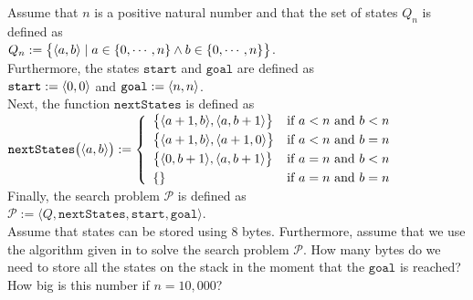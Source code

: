 \exercise
Assume that $n$ is a positive natural number and that the set of states $Q_n$ is defined as
\\[0.2cm]
\hspace*{1.3cm}
$Q_n := \bigl\{ \pair(a, b) \mid a \in \{0,\cdots,n\} \wedge b \in \{0,\cdots,n\} \bigr\}$.
\\[0.2cm]
Furthermore, the states $\mathtt{start}$ and $\mathtt{goal}$ are defined as
\\[0.2cm]
\hspace*{1.3cm}
$\mathtt{start} := \pair(0,0)$ \quad and \quad $\mathtt{goal} := \pair(n,n)$.
\\[0.2cm]
Next, the function $\mathtt{nextStates}$ is defined as
\\[0.2cm]
\hspace*{1.3cm}
$\mathtt{nextStates}\bigl(\pair(a,b)\bigr) := \left\{
\begin{array}{ll}
\bigl\{\pair(a+1,b), \pair(a,b+1)\bigr\}  & \mbox{if $a < n$ and $b < n$} \\[0.1cm]
\bigl\{\pair(a+1,b), \pair(a+1,0)\bigr\}  & \mbox{if $a < n$ and $b = n$} \\[0.1cm]
\bigl\{\pair(0,b+1), \pair(a,b+1)\bigr\}  & \mbox{if $a = n$ and $b < n$} \\[0.1cm]
\{\}  & \mbox{if $a = n$ and $b = n$} 
\end{array}
\right.
$
\\[0.2cm]
Finally, the search problem $\mathcal{P}$ is defined as
\\[0.2cm]
\hspace*{1.3cm}
$\mathcal{P} := \langle Q, \mathtt{nextStates}, \mathtt{start}, \mathtt{goal} \rangle$.
\\[0.2cm]
Assume that states can be stored using 8 bytes.  Furthermore, assume that we use the algorithm given in
 to solve the search problem $\mathcal{P}$.
How many bytes do we need to store all the states on the stack in the moment that the $\mathtt{goal}$
is reached? How big is this number if $n = 10,000$?
\vspace*{0.2cm}

